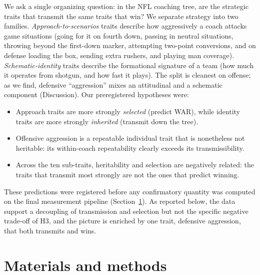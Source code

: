 \documentclass[11pt]{article}
\begin{document}
We ask a single organizing question: in the NFL coaching tree, are the strategic
traits that transmit the same traits that win? We separate strategy into two
families. \emph{Approach-to-scenarios} traits describe how aggressively a coach
attacks game situations (going for it on fourth down, passing in neutral
situations, throwing beyond the first-down marker, attempting two-point
conversions, and on defense loading the box, sending extra rushers, and playing man
coverage). \emph{Schematic-identity} traits describe the formational signature of a
team (how much it operates from shotgun, and how fast it plays). The split is
cleanest on offense; as we find, defensive ``aggression'' mixes an attitudinal and a
schematic component (Discussion). Our preregistered hypotheses were:
\begin{itemize}
  \item[H1.] Approach traits are more strongly \emph{selected} (predict WAR), while
  identity traits are more strongly \emph{inherited} (transmit down the tree).
  \item[H2.] Offensive aggression is a repeatable individual trait that is
  nonetheless not heritable: its within-coach repeatability clearly exceeds its
  transmissibility.
  \item[H3.] Across the ten sub-traits, heritability and selection are negatively
  related: the traits that transmit most strongly are not the ones that predict
  winning.
\end{itemize}
These predictions were registered before any confirmatory quantity was computed on
the final measurement pipeline (Section~\ref{sec:methods}). As reported below, the
data support a decoupling of transmission and selection but not the specific
negative trade-off of H3, and the picture is enriched by one trait, defensive
aggression, that both transmits and wins.

\section{Materials and methods}\label{sec:methods}
\end{document}
